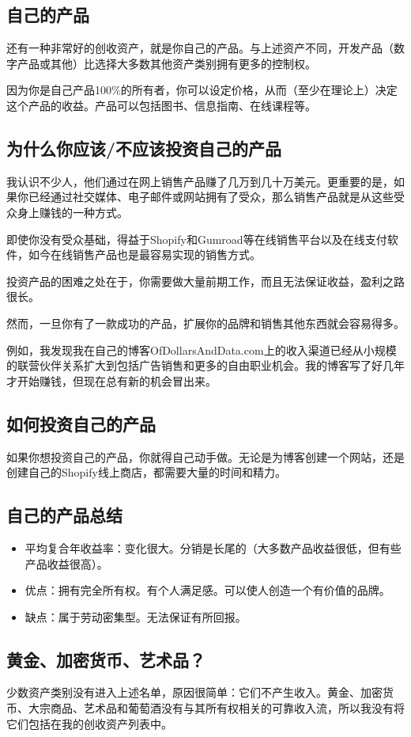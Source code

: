 \subsection{自己的产品}
还有一种非常好的创收资产，就是你自己的产品。与上述资产不同，开发产品（数字产品或其他）比选择大多数其他资产类别拥有更多的控制权。

因为你是自己产品100\%的所有者，你可以设定价格，从而（至少在理论上）决定这个产品的收益。产品可以包括图书、信息指南、在线课程等。

\subsection{为什么你应该/不应该投资自己的产品}
我认识不少人，他们通过在网上销售产品赚了几万到几十万美元。更重要的是，如果你已经通过社交媒体、电子邮件或网站拥有了受众，那么销售产品就是从这些受众身上赚钱的一种方式。

即使你没有受众基础，得益于Shopify和Gumroad等在线销售平台以及在线支付软件，如今在线销售产品也是最容易实现的销售方式。

投资产品的困难之处在于，你需要做大量前期工作，而且无法保证收益，盈利之路很长。

然而，一旦你有了一款成功的产品，扩展你的品牌和销售其他东西就会容易得多。

例如，我发现我在自己的博客OfDollarsAndData.com上的收入渠道已经从小规模的联营伙伴关系扩大到包括广告销售和更多的自由职业机会。我的博客写了好几年才开始赚钱，但现在总有新的机会冒出来。

\subsection{如何投资自己的产品}
如果你想投资自己的产品，你就得自己动手做。无论是为博客创建一个网站，还是创建自己的Shopify线上商店，都需要大量的时间和精力。

\subsection{自己的产品总结}
\begin{itemize}
\item 平均复合年收益率：变化很大。分销是长尾的（大多数产品收益很低，但有些产品收益很高）。
\item 优点：拥有完全所有权。有个人满足感。可以使人创造一个有价值的品牌。
\item 缺点：属于劳动密集型。无法保证有所回报。
\end{itemize}
\subsection{黄金、加密货币、艺术品？}
少数资产类别没有进入上述名单，原因很简单：它们不产生收入。黄金、加密货币、大宗商品、艺术品和葡萄酒没有与其所有权相关的可靠收入流，所以我没有将它们包括在我的创收资产列表中。


